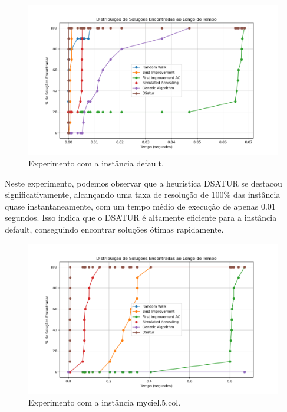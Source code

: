 \documentclass[12pt,a4paper]{article}
\begin{document}
\begin{figure}[H]
    \centering
    \includegraphics[width=1\textwidth]{./img/output-default.png}
    \caption{Experimento com a instância default.}
    \label{fig:experimento-default}
\end{figure}

Neste experimento, podemos observar que a heurística DSATUR se destacou significativamente, alcançando uma taxa de resolução de 100\% das instância quase instantaneamente, com um tempo médio de execução de apenas 0.01 segundos. Isso indica que o DSATUR é altamente eficiente para a instância default, conseguindo encontrar soluções ótimas rapidamente.


\begin{figure}[H]
    \centering
    \includegraphics[width=1\textwidth]{./img/output-myciel5.png}
    \caption{Experimento com a instância myciel.5.col.}
    \label{fig:experimento-myciel5}
\end{figure}
\end{document}
